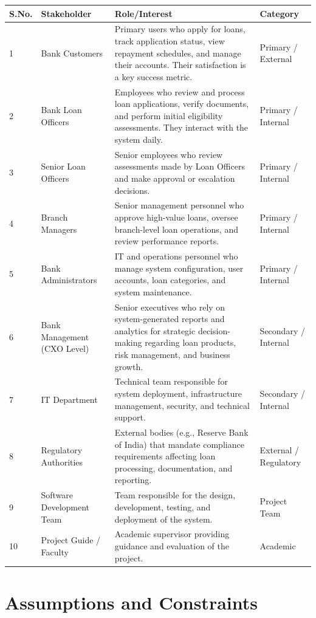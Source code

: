 \documentclass[12pt,a4paper,oneside]{report}
\begin{document}
\begin{table}[htbp]
\centering
\small
\begin{tabularx}{\textwidth}{l l X X}
\toprule
\textbf{S.No.} & \textbf{Stakeholder} & \textbf{Role/Interest} & \textbf{Category} \\
\midrule
1 & Bank Customers & Primary users who apply for loans, track application status, view repayment schedules, and manage their accounts. Their satisfaction is a key success metric. & Primary / External \\
2 & Bank Loan Officers & Employees who review and process loan applications, verify documents, and perform initial eligibility assessments. They interact with the system daily. & Primary / Internal \\
3 & Senior Loan Officers & Senior employees who review assessments made by Loan Officers and make approval or escalation decisions. & Primary / Internal \\
4 & Branch Managers & Senior management personnel who approve high-value loans, oversee branch-level loan operations, and review performance reports. & Primary / Internal \\
5 & Bank Administrators & IT and operations personnel who manage system configuration, user accounts, loan categories, and system maintenance. & Primary / Internal \\
6 & Bank Management (CXO Level) & Senior executives who rely on system-generated reports and analytics for strategic decision-making regarding loan products, risk management, and business growth. & Secondary / Internal \\
7 & IT Department & Technical team responsible for system deployment, infrastructure management, security, and technical support. & Secondary / Internal \\
8 & Regulatory Authorities & External bodies (e.g., Reserve Bank of India) that mandate compliance requirements affecting loan processing, documentation, and reporting. & External / Regulatory \\
9 & Software Development Team & Team responsible for the design, development, testing, and deployment of the system. & Project Team \\
10 & Project Guide / Faculty & Academic supervisor providing guidance and evaluation of the project. & Academic \\
\bottomrule
\end{tabularx}
\end{table}

\section{Assumptions and Constraints}
\end{document}
